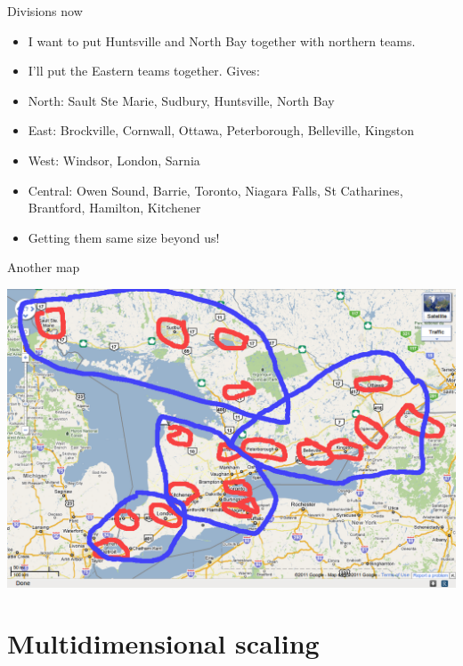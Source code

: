 \documentclass[ignorenonframetext,]{beamer}
\begin{document}
\begin{frame}{Divisions now}
\protect\hypertarget{divisions-now}{}

\begin{itemize}
\item
  I want to put Huntsville and North Bay together with northern teams.
\item
  I'll put the Eastern teams together. Gives:
\item
  North: Sault Ste Marie, Sudbury, Huntsville, North Bay
\item
  East: Brockville, Cornwall, Ottawa, Peterborough, Belleville, Kingston
\item
  West: Windsor, London, Sarnia
\item
  Central: Owen Sound, Barrie, Toronto, Niagara Falls, St Catharines,
  Brantford, Hamilton, Kitchener
\item
  Getting them same size beyond us!
\end{itemize}

\end{frame}

\begin{frame}{Another map}
\protect\hypertarget{another-map}{}

\includegraphics{map2.png}

\end{frame}

\hypertarget{multidimensional-scaling}{%
\section{Multidimensional scaling}\label{multidimensional-scaling}}
\end{document}
